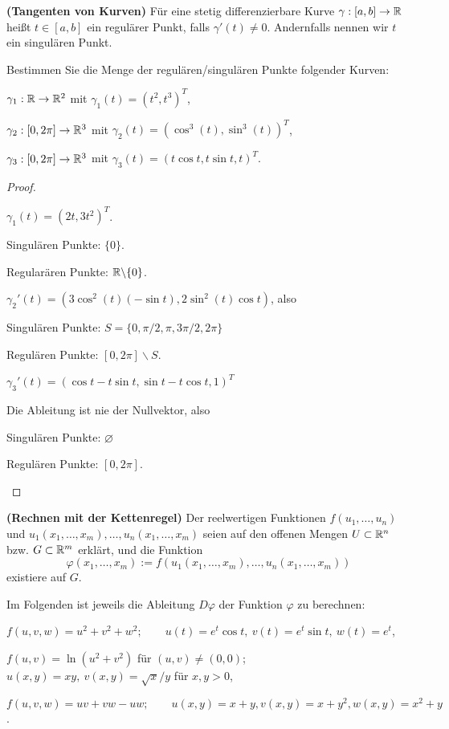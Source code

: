 \begin{Problem}
	\textbf{(Tangenten von Kurven)} Für eine stetig differenzierbare Kurve $\gamma:[a,b]\to \mathbb{R}$ heißt $t\in [a,b]$ ein regulärer Punkt, falls $\gamma'(t)\neq 0$. Andernfalls nennen wir $t$ ein singulären Punkt.

Bestimmen Sie die Menge der regulären/singulären Punkte folgender Kurven:	
\begin{parts}
\item $\gamma_1:\mathbb{R}\to \mathbb{R}^2$ mit $\gamma_1(t)=(t^2,t^3)^T$,
\item $\gamma_2:[0,2\pi]\to \mathbb{R}^3$ mit $\gamma_2(t)=(\cos^3(t),\sin^3(t))^T$,
\item $\gamma_3:[0,2\pi]\to \mathbb{R}^3$ mit $\gamma_3(t)=(t\cos t,t\sin t, t)^T$.
\end{parts}
\end{Problem}
\begin{proof}
	\begin{parts}
	\item $\gamma_1(t)=(2t,3t^2)^T$.

		Singulären Punkte: $\{0\} $.
		
		Regularären Punkte: $\mathbb{R}\backslash \{0\} $.
	\item $\gamma_2'(t)=(3\cos^2(t)(-\sin t), 2\sin^2(t)\cos t)$, also

		Singulären Punkte: $S=\{0,\pi / 2, \pi, 3\pi / 2, 2\pi\} $

		Regulären Punkte: $[0,2\pi] \backslash S$.
	\item  $\gamma_3'(t)=(\cos t-t\sin t,\sin t-t\cos t,1)^T$

		Die Ableitung ist nie der Nullvektor, also

		Singulären Punkte: $\varnothing$ 

		Regulären Punkte: $[0,2\pi]$.\qedhere
	\end{parts}
\end{proof}
\begin{Problem}
	\textbf{(Rechnen mit der Kettenregel)} Der reelwertigen Funktionen $f(u_1,\dots, u_n)$ und $u_1(x_1,\dots, x_m),\dots, u_n(x_1,\dots, x_m)$ seien auf den offenen Mengen $U\subset \mathbb{R}^n$ bzw. $G\subset \mathbb{R}^m$ erklärt, und die Funktion
	\[
	\varphi(x_1,\dots, x_m):=f(u_1(x_1,\dots, x_m),\dots, u_n(x_1,\dots, x_m))
\]
existiere auf $G$.

Im Folgenden ist jeweils die Ableitung $D\varphi$ der Funktion $\varphi$ zu berechnen:
\begin{parts}
\item $f(u,v,w)=u^2+v^2+w^2;\qquad u(t)=e^t\cos t,~v(t)=e^t\sin t,~w(t)=e^t$,
\item $f(u,v)=\ln(u^2+v^2)$ f\"{u}r $(u,v)\neq (0,0)$; $u(x,y)=xy,~v(x,y)=\sqrt{x} / y$ f\"{u}r $x,y>0$,
\item $f(u,v,w)=uv+vw-uw;\qquad u(x,y)=x+y,v(x,y)=x+y^2,w(x,y)=x^2+y$.
\end{parts}
\end{Problem}
